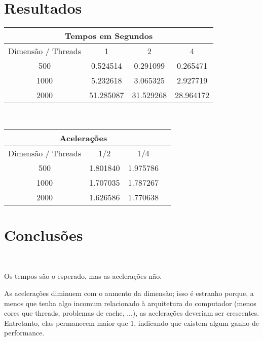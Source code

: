 \documentclass[12pt]{article}
\begin{document}
\section*{Resultados}

\begin{center}
    \begin{tabular}{|c|c|c|c|}
        \hline
        \multicolumn{4}{|c|}{Tempos em Segundos} \\
        \hline
        Dimensão / Threads & 1 & 2 & 4 \\
        \hline
         500 &  0.524514 &  0.291099 &  0.265471 \\
        1000 &  5.232618 &  3.065325 &  2.927719 \\
        2000 & 51.285087 & 31.529268 & 28.964172 \\
        \hline
    \end{tabular}
    
    \ \\[3ex]
    
    \begin{tabular}{|c|c|c|c|}
        \hline
        \multicolumn{3}{|c|}{Acelerações} \\
        \hline
        Dimensão / Threads & 1/2 & 1/4 \\
        \hline
         500 & 1.801840 & 1.975786 \\
        1000 & 1.707035 & 1.787267 \\
        2000 & 1.626586 & 1.770638 \\
        \hline
    \end{tabular}
\end{center}

\section*{Conclusões}

\ 

Os tempos são o esperado, mas as acelerações não.

As acelerações diminuem com o aumento da dimensão;
isso é estranho porque,
a menos que tenha algo incomum relacionado à arquitetura do computador
(menos cores que threads, problemas de cache, ...),
as acelerações deveriam ser crescentes.
Entretanto, elas permanecem maior que 1,
indicando que existem algum ganho de performance.
\end{document}
